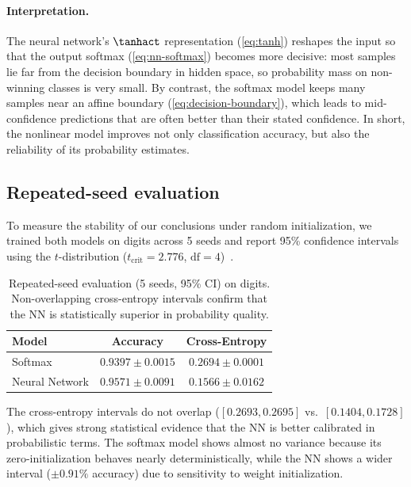 \documentclass[sigconf,screen,nonacm]{acmart}
\begin{document}
\paragraph{Interpretation.}
The neural network's $\tanhact$ representation (\cref{eq:tanh}) reshapes the input so that the output softmax (\cref{eq:nn-softmax}) becomes more decisive: most samples lie far from the decision boundary in hidden space, so probability mass on non-winning classes is very small. By contrast, the softmax model keeps many samples near an affine boundary (\cref{eq:decision-boundary}), which leads to mid-confidence predictions that are often better than their stated confidence. In short, the nonlinear model improves not only classification accuracy, but also the reliability of its probability estimates.

\subsection{Repeated-seed evaluation}
\label{sec:repeated-seeds}

To measure the stability of our conclusions under random initialization, we trained both models on digits across 5 seeds and report 95\% confidence intervals using the $t$-distribution ($t_{\text{crit}} = 2.776$, $\text{df} = 4$)~\cite{murphy2022pml}.

\begin{table}[H]
    \centering
    \caption{Repeated-seed evaluation (5 seeds, 95\% CI) on digits. Non-overlapping cross-entropy intervals confirm that the NN is statistically superior in probability quality.}
    \label{tab:repeated-seeds}
    \begin{tabular}{lcc}
        \toprule
        Model & Accuracy & Cross-Entropy \\
        \midrule
        Softmax & $0.9397 \pm 0.0015$ & $0.2694 \pm 0.0001$ \\
        Neural Network & $0.9571 \pm 0.0091$ & $0.1566 \pm 0.0162$ \\
        \bottomrule
    \end{tabular}
\end{table}

The cross-entropy intervals do not overlap ($[0.2693, 0.2695]$ vs.\ $[0.1404, 0.1728]$), which gives strong statistical evidence that the NN is better calibrated in probabilistic terms. The softmax model shows almost no variance because its zero-initialization behaves nearly deterministically, while the NN shows a wider interval ($\pm 0.91\%$ accuracy) due to sensitivity to weight initialization.
\end{document}
